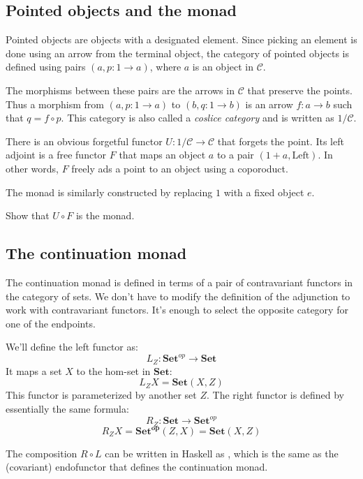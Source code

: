 \documentclass[DaoFP]{subfiles}
\begin{document}
\subsection{Pointed objects and the  monad}

Pointed objects are objects with a designated element. Since picking an element is done using an arrow from the terminal object, the category of pointed objects is defined using pairs $(a, p \colon 1 \to a)$, where $a$ is an object in $\mathcal{C}$. 

The morphisms between these pairs are the arrows in $\mathcal{C}$ that preserve the points. Thus a morphism from $(a, p \colon 1 \to a)$ to $(b, q \colon 1 \to b)$ is an arrow $f \colon a \to b$ such that $q = f \circ p$. This category is also called a \emph{coslice category} and is written as $1/\mathcal{C}$.

There is an obvious forgetful functor $U \colon 1/\mathcal{C} \to \mathcal{C}$ that forgets the point. Its left adjoint is a free functor $F$ that maps an object $a$ to a pair $(1 + a, \text{Left})$. In other words, $F$ freely ads a point to an object using a coporoduct. 

The  monad is similarly constructed by replacing $1$ with a fixed object $e$.

\begin{exercise}
Show that $U \circ F$ is the  monad.
\end{exercise}

\subsection{The continuation monad}

The continuation monad is defined in terms of a pair of contravariant functors in the category of sets. We don't have to modify the definition of the adjunction to work with contravariant functors. It's enough to select the opposite category for one of the endpoints. 

We'll define the left functor as:
\[ L_Z \colon \mathbf{Set}^{op} \to \mathbf{Set} \] 
It maps a set $X$ to the hom-set in $\mathbf{Set}$:
\[ L_Z X = \mathbf{Set}(X, Z) \] 
This functor is parameterized by another set $Z$. The right functor is defined by essentially the same formula:
\[ R_Z \colon \mathbf{Set} \to \mathbf{Set}^{op} \] 
\[ R_Z X = \mathbf{Set^{op}}(Z, X)  = \mathbf{Set}(X, Z) \] 


The composition $R \circ L$ can be written in Haskell as , which is the same as the (covariant) endofunctor that defines the continuation monad.
\end{document}
